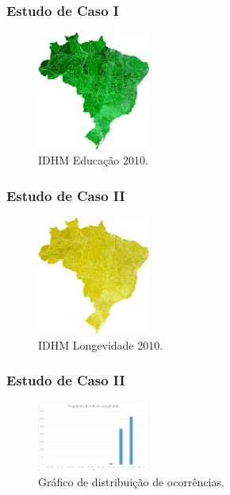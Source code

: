 \documentclass[aspectratio=169]{beamer}
\begin{document}
\begin{frame}
\frametitle{Estudo de Caso I}
\justifying

\begin{figure}
\centering
\includegraphics[width=0.33\textwidth]{images/educacao-2010.png}
\caption{IDHM Educação 2010.}
\end{figure}


\end{frame}

\begin{frame}
\frametitle{Estudo de Caso II}
\justifying

\begin{figure}
\centering
\includegraphics[width=0.33\textwidth]{images/longevidade.png}
\caption{IDHM Longevidade 2010.}
\end{figure}

\end{frame}

\begin{frame}
\frametitle{Estudo de Caso II}
\justifying

\begin{figure}
\centering
\includegraphics[width=0.33\textwidth]{images/frequencia.png}
\caption{Gráfico de distribuição de ocorrências.}
\end{figure}

\end{frame}
\end{document}
